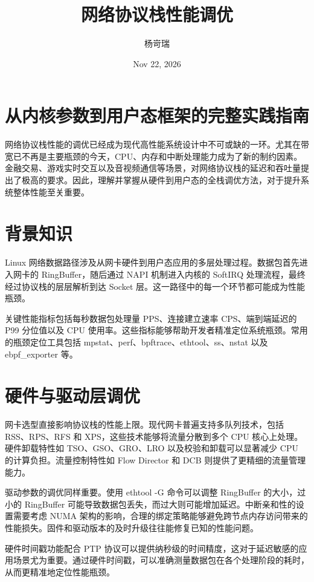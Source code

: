 \title{网络协议栈性能调优}
\author{杨岢瑞}
\date{Nov 22, 2026}
\maketitle
\chapter{从内核参数到用户态框架的完整实践指南}
网络协议栈性能的调优已经成为现代高性能系统设计中不可或缺的一环。尤其在带宽已不再是主要瓶颈的今天，CPU、内存和中断处理能力成为了新的制约因素。金融交易、游戏实时交互以及音视频通信等场景，对网络协议栈的延迟和吞吐量提出了极高的要求。因此，理解并掌握从硬件到用户态的全栈调优方法，对于提升系统整体性能至关重要。\par
\chapter{背景知识}
Linux 网络数据路径涉及从网卡硬件到用户态应用的多层处理过程。数据包首先进入网卡的 RingBuffer，随后通过 NAPI 机制进入内核的 SoftIRQ 处理流程，最终经过协议栈的层层解析到达 Socket 层。这一路径中的每一个环节都可能成为性能瓶颈。\par
关键性能指标包括每秒数据包处理量 PPS、连接建立速率 CPS、端到端延迟的 P99 分位值以及 CPU 使用率。这些指标能够帮助开发者精准定位系统瓶颈。常用的瓶颈定位工具包括 mpstat、perf、bpftrace、ethtool、ss、nstat 以及 ebpf\_{}exporter 等。\par
\chapter{硬件与驱动层调优}
网卡选型直接影响协议栈的性能上限。现代网卡普遍支持多队列技术，包括 RSS、RPS、RFS 和 XPS，这些技术能够将流量分散到多个 CPU 核心上处理。硬件卸载特性如 TSO、GSO、GRO、LRO 以及校验和卸载可以显著减少 CPU 的计算负担。流量控制特性如 Flow Director 和 DCB 则提供了更精细的流量管理能力。\par
驱动参数的调优同样重要。使用 ethtool -G 命令可以调整 RingBuffer 的大小，过小的 RingBuffer 可能导致数据包丢失，而过大则可能增加延迟。中断亲和性的设置需要考虑 NUMA 架构的影响，合理的绑定策略能够避免跨节点内存访问带来的性能损失。固件和驱动版本的及时升级往往能修复已知的性能问题。\par
硬件时间戳功能配合 PTP 协议可以提供纳秒级的时间精度，这对于延迟敏感的应用场景尤为重要。通过硬件时间戳，可以准确测量数据包在各个处理阶段的耗时，从而更精准地定位性能瓶颈。\par
